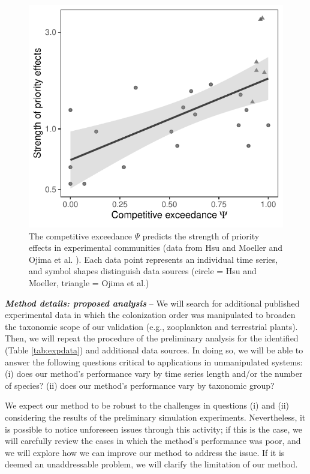 \documentclass[12pt, class=article, crop=false]{standalone}
\begin{document}
\begin{figure}
    \includegraphics[scale=0.6]{output/figure_exp.pdf}
    \caption{The competitive exceedance $\Psi$ predicts the strength of priority effects in experimental communities (data from Hsu and Moeller \citep{hsu_metabolic_2021} and Ojima et al. \citep{ojima_priority_2022}).
    Each data point represents an individual time series, and symbol shapes distinguish data sources (circle = Hsu and Moeller, triangle = Ojima et al.)}
    \label{fig:experiment}
\end{figure}

\textit{\textbf{Method details: proposed analysis}} --
We will search for additional published experimental data in which the colonization order was manipulated to broaden the taxonomic scope of our validation (e.g., zooplankton and terrestrial plants).
Then, we will repeat the procedure of the preliminary analysis for the identified (Table \ref{tab:expdata}) and additional data sources. 
In doing so, we will be able to answer the following questions critical to applications in unmanipulated systems: (i) does our method's performance vary by time series length and/or the number of species? (ii) does our method's performance vary by taxonomic group?

We expect our method to be robust to the challenges in questions (i) and (ii) considering the results of the preliminary simulation experiments.
Nevertheless, it is possible to notice unforeseen issues through this activity; if this is the case, we will carefully review the cases in which the method's performance was poor, and we will explore how we can improve our method to address the issue.
If it is deemed an unaddressable problem, we will clarify the limitation of our method.
\end{document}
